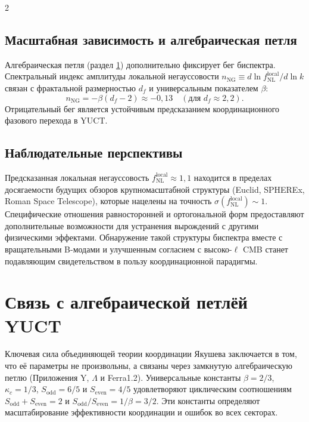 \documentclass[11pt,a4paper]{article}
\begin{document}
\begin{multicols}{2}
		\subsection{Масштабная зависимость и алгебраическая петля}
		Алгебраическая петля (раздел \ref{sec:algebraic}) дополнительно фиксирует бег биспектра. Спектральный индекс амплитуды локальной негауссовости $n_{\mathrm{NG}} \equiv d\ln f_{\mathrm{NL}}^{\mathrm{local}} / d\ln k$ связан с фрактальной размерностью $d_f$ и универсальным показателем $\beta$:
		\begin{equation}
			n_{\mathrm{NG}} = -\beta (d_f - 2) \approx -0,13 \quad (\text{для } d_f \approx 2,2).
		\end{equation}
		Отрицательный бег является устойчивым предсказанием координационного фазового перехода в YUCT.
		
		\subsection{Наблюдательные перспективы}
		Предсказанная локальная негауссовость $f_{\mathrm{NL}}^{\mathrm{local}} \approx 1,1$ находится в пределах досягаемости будущих обзоров крупномасштабной структуры (Euclid, SPHEREx, Roman Space Telescope), которые нацелены на точность $\sigma(f_{\mathrm{NL}}^{\mathrm{local}}) \sim 1$. Специфические отношения равносторонней и ортогональной форм предоставляют дополнительные возможности для устранения вырождений с другими физическими эффектами. Обнаружение такой структуры биспектра вместе с вращательными B-модами и улучшенным согласием с высоко-$\ell$ CMB станет подавляющим свидетельством в пользу координационной парадигмы.
		
		\section{Связь с алгебраической петлёй YUCT}
		\label{sec:algebraic}
		
		Ключевая сила объединяющей теории координации Якушева заключается в том, что её параметры не произвольны, а связаны через замкнутую алгебраическую петлю (Приложения Y, $\Lambda$ и Ferra1.2). Универсальные константы $\beta=2/3$, $\kappa_c=1/3$, $S_{\mathrm{odd}}=6/5$ и $S_{\mathrm{even}}=4/5$ удовлетворяют циклическим соотношениям $S_{\mathrm{odd}}+S_{\mathrm{even}}=2$ и $S_{\mathrm{odd}}/S_{\mathrm{even}} = 1/\beta = 3/2$. Эти константы определяют масштабирование эффективности координации и ошибок во всех секторах.
		

\end{multicols}
\end{document}
